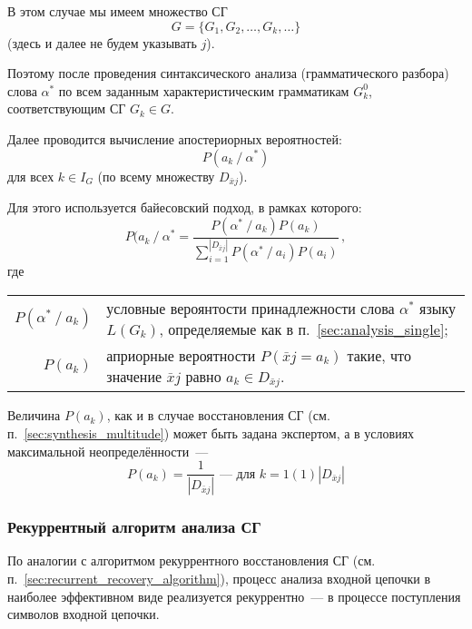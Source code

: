В этом случае мы имеем множество СГ
\begin{equation*}
  G = \{G_1, G_2, \ldots, G_k, \ldots\}
\end{equation*}
(здесь и далее не будем указывать $j$).

Поэтому после проведения синтаксического анализа (грамматического
разбора) слова $\alpha^*$ по всем заданным характеристическим
грамматикам $G_k^0$, соответствующим СГ $G_k \in G$.

Далее проводится вычисление апостериорных вероятностей:
\begin{equation*}
  P(a_k \mathop{/} \alpha^*)
\end{equation*}
для всех $k \in I_G$ (по всему множеству $D_{\bar{x}j}$).

Для этого используется байесовский подход, в рамках которого:
\begin{equation*}
  P(a_k \mathop{/} \alpha^* = \frac{P(\alpha^* \mathop{/} a_k) P(a_k)}
  {\sum\limits_{i = 1}^{|D_{\bar{x}j}|} P(\alpha^* \mathop{/} a_i) P(a_i)}\,,
\end{equation*}
где \begin{tabular}[t]{@{} r @{\;---\;} p{} @{}}
  $P(\alpha^* \mathop{/} a_k)$ & условные вероянтости принадлежности
  слова $\alpha^*$ языку $L(G_k)$, определяемые как в
  п.~\ref{sec:analysis_single};\\
  $P(a_k)$ & априорные вероятности $P(\bar{x}j = a_k)$ такие, что
  значение $\bar{x}j$ равно $a_k \in D_{\bar{x}j}$.
\end{tabular}

Величина $P(a_k)$, как и в случае восстановления СГ
(см. п.~\ref{sec:synthesis_multitude}) может быть задана экспертом, а
в условиях максимальной неопределённости~---
\begin{equation*}
  P(a_k) = \frac 1 {|D_{\bar{x}j}|}\text{~--- для $k = 1(1)
    \left|D_{\bar{x}j}\right|$}
\end{equation*}

\begin{ex}
  
\end{ex}


\subsubsection{Рекуррентный алгоритм анализа СГ}

По аналогии с алгоритмом рекуррентного восстановления СГ
(см. п.~\ref{sec:recurrent_recovery_algorithm}), процесс анализа
входной цепочки в наиболее эффективном виде реализуется
рекуррентно~--- в процессе поступления символов входной цепочки.

